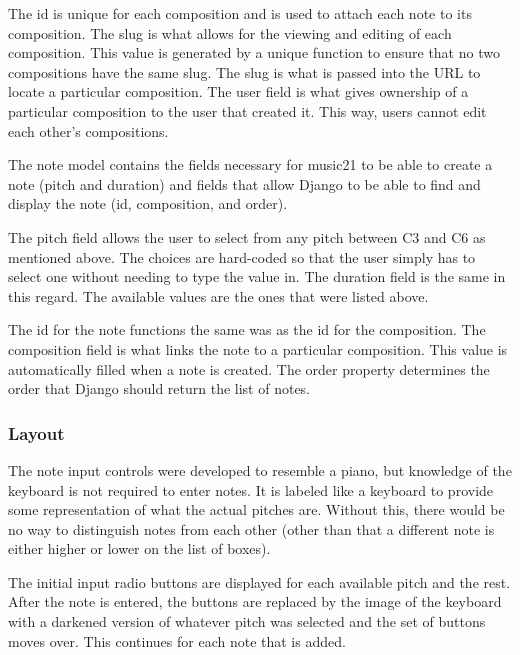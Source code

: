 The id is unique for each composition and is used to attach each note to its composition.  The slug is what allows for the viewing and editing of each composition.  This value is generated by a unique function to ensure that no two compositions have the same slug.  The slug is what is passed into the URL to locate a particular composition.  The user field is what gives ownership of a particular composition to the user that created it.  This way, users cannot edit each other's compositions.

\vspace{\baselineskip}

The note model contains the fields necessary for music21 to be able to create a note (pitch and duration) and fields that allow Django to be able to find and display the note (id, composition, and order).

\vspace{\baselineskip}

The pitch field allows the user to select from any pitch between C3 and C6 as mentioned above.  The choices are hard-coded so that the user simply has to select one without needing to type the value in.  The duration field is the same in this regard.  The available values are the ones that were listed above.

\vspace{\baselineskip}

The id for the note functions the same was as the id for the composition.  The composition field is what links the note to a particular composition.  This value is automatically filled when a note is created.  The order property determines the order that Django should return the list of notes.

\subsubsection{Layout}
\label{subsubsec:processlayout}

The note input controls were developed to resemble a piano, but knowledge of the keyboard is not required to enter notes.  It is labeled like a keyboard to provide some representation of what the actual pitches are.  Without this, there would be no way to distinguish notes from each other (other than that a different note is either higher or lower on the list of boxes).

\vspace{\baselineskip}

The initial input radio buttons are displayed for each available pitch and the rest.  After the note is entered, the buttons are replaced by the image of the keyboard with a darkened version of whatever pitch was selected and the set of buttons moves over.  This continues for each note that is added.

